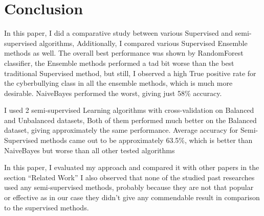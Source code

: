 \documentclass[10pt,conference]{IEEEtran}
\begin{document}
\section{Conclusion}
In this paper, I did a comparative study between various Supervised and semi-supervised algorithms, Additionally, I compared various Supervised Ensemble methods as well. The overall best performance was shown by RandomForest classifier, the Ensemble methods performed a tad bit worse than the best traditional Supervised method, but still, I observed a high True positive rate for the cyberbullying class in all the ensemble methods, which is much more desirable. NaiveBayes performed the worst, giving just 58\% accuracy.

I used 2 semi-supervised Learning algorithms with cross-validation on Balanced and Unbalanced datasets, Both of them performed much better on the Balanced dataset, giving approximately the same performance. Average accuracy for Semi-Supervised methods came out to be approximately 63.5\%, which is better than NaiveBayes but worse than all other tested algorithms

 In this paper, I evaluated my approach and compared it with other papers in the section “Related Work” I also observed that none of the studied past researches used any semi-supervised methods, probably because they are not that popular or effective as in our case they didn’t give any commendable result in comparison to the supervised methods.
\end{document}
